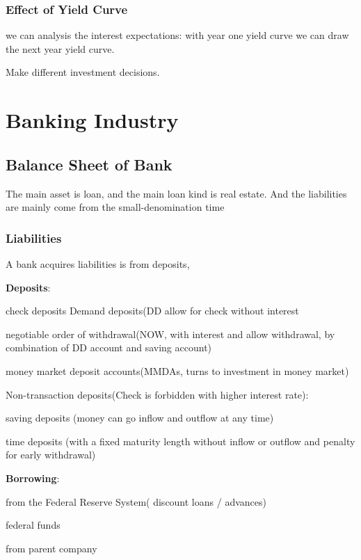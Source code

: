 \documentclass[10pt, a4paper]{article}
\begin{document}
    \subsubsection{Effect of Yield Curve}
        we can analysis the interest expectations: with year one yield curve we can draw the next year yield curve.  

        Make different investment decisions. 
\newpage

\section{Banking Industry}
    \subsection{Balance Sheet of Bank}  
        The main asset is loan, and the main loan kind is real estate. And the  liabilities are mainly come from the small-denomination time 
        \subsubsection{Liabilities}
            A bank acquires liabilities is from deposits, 

            \textbf{Deposits}: 
            
            \quad  check deposits Demand deposits(DD allow for check without interest 
            
            \quad negotiable order of withdrawal(NOW, with interest and allow withdrawal, by combination of DD account and saving account) 
            
            \quad money market deposit accounts(MMDAs, turns to investment in money market)
            
            Non-transaction deposits(Check is forbidden with higher interest rate): 

            \quad saving deposits (money can go inflow and outflow at any time)  

            \quad time deposits (with a fixed maturity length without inflow or outflow and penalty for early withdrawal)

            \textbf{Borrowing}: 
            
            \quad from the Federal Reserve System( discount loans / advances)

            \quad federal funds 

            \quad from parent company 
\end{document}
